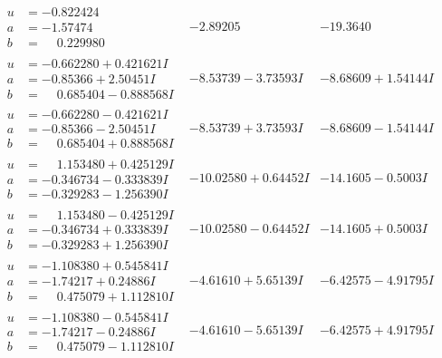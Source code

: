 \documentclass[1p]{elsarticle_modified}
\theoremstyle{definition}
\begin{document}
$$\begin{array}{c|c|c}
\begin{aligned}
u &= -0.822424\phantom{ +0.000000I} \\
a &= -1.57474\phantom{ +0.000000I} \\
b &= \phantom{-}0.229980\phantom{ +0.000000I}\end{aligned}
 & -2.89205\phantom{ +0.000000I} & -19.3640\phantom{ +0.000000I} \\ \hline\begin{aligned}
u &= -0.662280 + 0.421621 I \\
a &= -0.85366 + 2.50451 I \\
b &= \phantom{-}0.685404 - 0.888568 I\end{aligned}
 & -8.53739 - 3.73593 I & -8.68609 + 1.54144 I \\ \hline\begin{aligned}
u &= -0.662280 - 0.421621 I \\
a &= -0.85366 - 2.50451 I \\
b &= \phantom{-}0.685404 + 0.888568 I\end{aligned}
 & -8.53739 + 3.73593 I & -8.68609 - 1.54144 I \\ \hline\begin{aligned}
u &= \phantom{-}1.153480 + 0.425129 I \\
a &= -0.346734 - 0.333839 I \\
b &= -0.329283 - 1.256390 I\end{aligned}
 & -10.02580 + 0.64452 I & -14.1605 - 0.5003 I \\ \hline\begin{aligned}
u &= \phantom{-}1.153480 - 0.425129 I \\
a &= -0.346734 + 0.333839 I \\
b &= -0.329283 + 1.256390 I\end{aligned}
 & -10.02580 - 0.64452 I & -14.1605 + 0.5003 I \\ \hline\begin{aligned}
u &= -1.108380 + 0.545841 I \\
a &= -1.74217 + 0.24886 I \\
b &= \phantom{-}0.475079 + 1.112810 I\end{aligned}
 & -4.61610 + 5.65139 I & -6.42575 - 4.91795 I \\ \hline\begin{aligned}
u &= -1.108380 - 0.545841 I \\
a &= -1.74217 - 0.24886 I \\
b &= \phantom{-}0.475079 - 1.112810 I\end{aligned}
 & -4.61610 - 5.65139 I & -6.42575 + 4.91795 I \\ \hline\begin{aligned}

\end{aligned}
\end{array}$$
\end{document}
